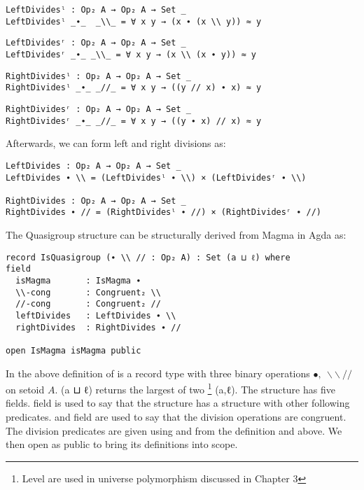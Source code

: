 \begin{verbatim}
LeftDividesˡ : Op₂ A → Op₂ A → Set _
LeftDividesˡ _∙_  _\\_ = ∀ x y → (x ∙ (x \\ y)) ≈ y
\end{verbatim}
\begin{verbatim}
LeftDividesʳ : Op₂ A → Op₂ A → Set _
LeftDividesʳ _∙_ _\\_ = ∀ x y → (x \\ (x ∙ y)) ≈ y
\end{verbatim}
\begin{verbatim}
RightDividesˡ : Op₂ A → Op₂ A → Set _
RightDividesˡ _∙_ _//_ = ∀ x y → ((y // x) ∙ x) ≈ y
\end{verbatim}
\begin{verbatim}
RightDividesʳ : Op₂ A → Op₂ A → Set _
RightDividesʳ _∙_ _//_ = ∀ x y → ((y ∙ x) // x) ≈ y
\end{verbatim}

Afterwards, we can form left and right divisions as:

\begin{verbatim}
LeftDivides : Op₂ A → Op₂ A → Set _
LeftDivides ∙ \\ = (LeftDividesˡ ∙ \\) × (LeftDividesʳ ∙ \\)

RightDivides : Op₂ A → Op₂ A → Set _
RightDivides ∙ // = (RightDividesˡ ∙ //) × (RightDividesʳ ∙ //)
\end{verbatim} 

The Quasigroup structure can be structurally derived from Magma in Agda as:

\begin{verbatim}
record IsQuasigroup (∙ \\ // : Op₂ A) : Set (a ⊔ ℓ) where
field
  isMagma       : IsMagma ∙
  \\-cong       : Congruent₂ \\
  //-cong       : Congruent₂ //
  leftDivides   : LeftDivides ∙ \\
  rightDivides  : RightDivides ∙ //

open IsMagma isMagma public
\end{verbatim}
In the above definition of  is a record type with three
binary operations $∙,\ \backslash\backslash \ //$ on setoid $A$. (a ⊔ ℓ)
returns the largest of two  \footnote{Level are used in universe
polymorphism discussed in Chapter 3} (a,ℓ). The structure has five fields.
 field is used to say that the structure 
has a structure  with other following predicates.
 and  field are used to say that the division
operations are congruent. The division predicates are given using
 and  from the definition
 and  above. We then open
 as public to bring its definitions into scope.

